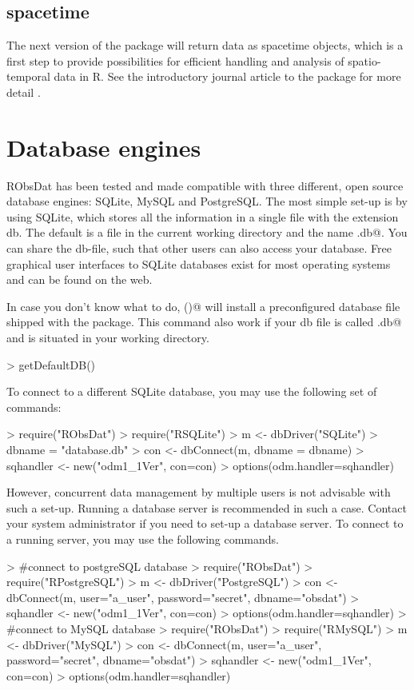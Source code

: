 \documentclass[a4paper]{article}
\begin{document}
\subsection{spacetime}
The next version of the package will return data
as spacetime objects, which is a first step to
provide possibilities for efficient handling and
analysis of spatio-temporal data in R. See the
introductory journal article to the package for
more detail \citep{Pebesma2012}.

\section{Database engines}
\label{sec:db_engines}
RObsDat has been tested and made compatible with
three different, open source database engines:
SQLite, MySQL and PostgreSQL. The most simple
set-up is by using SQLite, which stores all the
information in a single file with the extension
db. The default is a file in the current working
directory and the name \verb@RODM.db@. You can
share the db-file, such that other users can also
access your database. Free graphical user
interfaces to SQLite databases exist for most
operating systems and can be found on the web.

In case you don't know what to do,
\verb@getDefaultDB()@ will install a preconfigured
database file shipped with the package. This
command also work if your db file is called \verb@RODM.db@ and
is situated in your working directory.
\begin{Schunk}
\begin{Sinput}
> getDefaultDB()
\end{Sinput}
\end{Schunk}

To connect to a different SQLite
database, you may use the following set of
commands:
\begin{Schunk}
\begin{Sinput}
> require("RObsDat")
> require("RSQLite")
> m <- dbDriver("SQLite")
> dbname = "database.db"
> con <- dbConnect(m, dbname = dbname)
> sqhandler <-  new("odm1_1Ver", con=con)
> options(odm.handler=sqhandler)
\end{Sinput}
\end{Schunk}


However, concurrent data
management by multiple users is not advisable with
such a set-up. Running a database server is
recommended in such a case. Contact your system
administrator if you need to set-up a database
server. To connect to a running server, you may
use the following commands.
\begin{Schunk}
\begin{Sinput}
> #connect to postgreSQL database
> require("RObsDat")
> require("RPostgreSQL")
> m <- dbDriver("PostgreSQL")
> con <- dbConnect(m, user="a_user", password="secret", dbname="obsdat")
> sqhandler <-  new("odm1_1Ver", con=con)
> options(odm.handler=sqhandler)
> #connect to MySQL database
> require("RObsDat")
> require("RMySQL")
> m <- dbDriver("MySQL")
> con <- dbConnect(m, user="a_user", password="secret", dbname="obsdat")
> sqhandler <-  new("odm1_1Ver", con=con)
> options(odm.handler=sqhandler)
\end{Sinput}
\end{Schunk}
\end{document}
